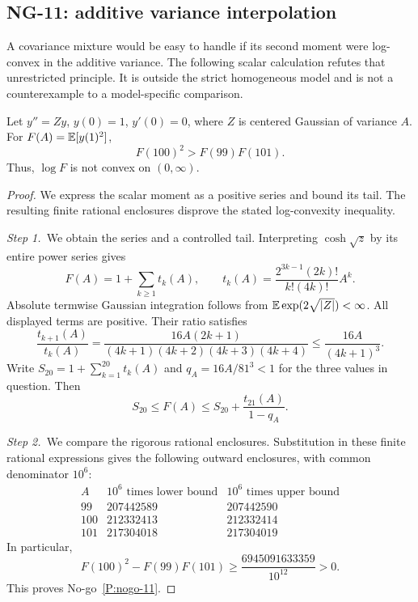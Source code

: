 \subsection{NG-11: additive variance interpolation}\label{S:nogo-11}

A covariance mixture would be easy to handle if its second moment were
log-convex in the additive variance. The following scalar calculation
refutes that unrestricted principle. It is outside the strict homogeneous
model and is not a counterexample to a model-specific comparison.

\setcounter{nogo}{10}
\begin{nogo}\label{P:nogo-11}
  Let $y''=Zy$, $y(0)=1$, $y'(0)=0$, where $Z$ is centered Gaussian of
  variance $A$. For $F(A)=\mathbb{E}[y(1)^2]$,
  \[
    F(100)^2>F(99)F(101).
  \]
  Thus, $\log F$ is not convex on $(0,\infty)$.
\end{nogo}
\begin{proof}
  We express the scalar moment as a positive series and bound its tail. The
  resulting finite rational enclosures disprove the stated log-convexity
  inequality.


  \medskip
  \noindent\textit{Step 1.~}We obtain the series and a controlled tail.
  Interpreting $\cosh\sqrt z$ by its entire power series gives
  \[
    F(A)=1+\sum_{k\ge1}t_k(A),\qquad
    t_k(A)=\frac{2^{3k-1}(2k)!}{k!(4k)!}A^k.
  \]
  Absolute termwise Gaussian integration follows from
  $\mathbb{E}\exp(2\sqrt{|Z|})<\infty$. All displayed terms are positive.
  Their ratio satisfies
  \[
    \frac{t_{k+1}(A)}{t_k(A)}
    =\frac{16A(2k+1)}{(4k+1)(4k+2)(4k+3)(4k+4)}
    \le\frac{16A}{(4k+1)^3}.
  \]
  Write $S_{20}=1+\sum_{k=1}^{20}t_k(A)$ and
  $q_A=16A/81^3<1$ for the three values in question. Then
  \[
    S_{20}\le F(A)\le S_{20}+\frac{t_{21}(A)}{1-q_A}.
  \]

  \medskip
  \noindent\textit{Step 2.~}We compare the rigorous rational enclosures.
  Substitution in these finite rational expressions gives the following
  outward enclosures, with common denominator $10^6$:
  \[
    \begin{array}{c|rr}
      A&10^6\text{ times lower bound}&10^6\text{ times upper bound}\\ \hline
      99&207442589&207442590\\
      100&212332413&212332414\\
      101&217304018&217304019
    \end{array}
  \]
  In particular,
  \[
    F(100)^2-F(99)F(101)
    \ge\frac{6945091633359}{10^{12}}>0.
  \]
  This proves No-go~\ref{P:nogo-11}.
\end{proof}

